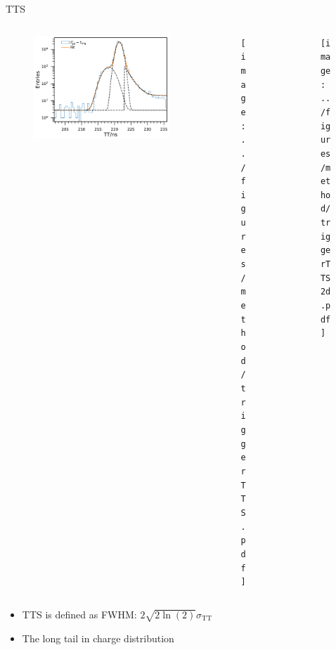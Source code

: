 \documentclass[aspectratio=169]{beamer}
\begin{document}
\begin{frame}{TTS}
    \begin{columns}
        \begin{column}{0.33\textwidth}
            \begin{figure}
                \includegraphics[width=\columnwidth]{../figures/method/triggerTTSLog.pdf}    
            \end{figure}
        \end{column}
        \begin{column}{0.33\textwidth}
            \begin{figure}
                \texttt{[image: ../figures/method/triggerTTS.pdf]}    
            \end{figure}
        \end{column}
        \begin{column}{0.33\textwidth}
            \begin{figure}
                \texttt{[image: ../figures/method/triggerTTS2d.pdf]}    
            \end{figure}
        \end{column}
    \end{columns}
    \begin{itemize}
        \item TTS is defined as FWHM: $2\sqrt{2\ln(2)}\sigma_{\mathrm{TT}}$
        \item The long tail in charge distribution
    \end{itemize}
\end{frame}
\end{document}
